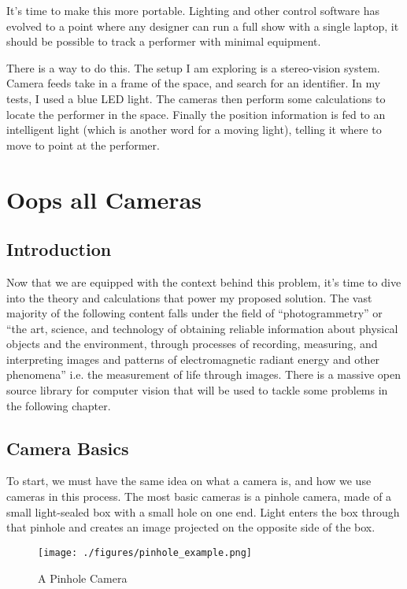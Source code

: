 \documentclass[
    12pt,
    twoside,
    bibstyle=chicago,
    headerstyle=uppercase,
	bibfile=thesis.bib
]{reedthesis}
\begin{document}
	It's time to make this more portable. Lighting and other control software has evolved to a point where any designer can run a full show with a single laptop, it should be possible to track a performer with minimal equipment.
	
	There is a way to do this. The setup I am exploring is a stereo-vision system. Camera feeds take in a frame of the space, and search for an identifier. In my tests, I used a blue LED light. The cameras then perform some calculations to locate the performer in the space. Finally the position information is fed to an intelligent light (which is another word for a moving light), telling it where to move to point at the performer.



\chapter{Oops all Cameras}


\section{Introduction}
	Now that we are equipped with the context behind this problem, it's time to dive into the theory and calculations that power my proposed solution. The vast majority of the following content falls under the field of “photogrammetry” or “the art, science, and technology of obtaining reliable information about physical objects and the environment, through processes of recording, measuring, and interpreting images and patterns of electromagnetic radiant energy and other phenomena” i.e. the measurement of life through images. There is a massive open source library for computer vision that will be used to tackle some problems in the following chapter. \autocite{pulli_real-time_2012}
	
\section{Camera Basics}
To start, we must have the same idea on what a camera is, and how we use cameras in this process. The most basic cameras is a pinhole camera, made of a small light-sealed box with a small hole on one end. Light enters the box through that pinhole and creates an image projected on the opposite side of the box.

\begin{figure}[h]
	    \centering
	    \texttt{[image: ./figures/pinhole\_example.png]}
	    \caption{A Pinhole Camera}
	\label{Pinhole}
	\end{figure}
\end{document}
